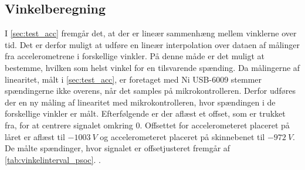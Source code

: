 \subsection{Vinkelberegning}\label{sec:imp_vinkler}
I \autoref{sec:test_acc} fremgår det, at der er lineær sammenhæng mellem vinklerne over tid. Det er derfor muligt at udføre en lineær interpolation over dataen af målinger fra accelerometrene i forskellige vinkler. På denne måde er det muligt at bestemme, hvilken som helst vinkel for en tilsvarende spænding. Da målingerne af linearitet, målt i \autoref{sec:test_acc}, er foretaget med Ni USB-6009 stemmer spændingerne ikke overens, når det samples på mikrokontrolleren. Derfor udføres der en ny måling af linearitet med mikrokontrolleren, hvor spændingen i de forskellige vinkler er målt. Efterfølgende er der aflæst et offset, som er trukket fra, for at centrere signalet omkring 0. Offsettet for accelerometeret placeret på låret er aflæst til $-1003~V$ og accelerometeret placeret på skinnebenet til $-972~V$. De målte spændinger, hvor signalet er offsetjusteret fremgår af \autoref{tab:vinkelinterval_psoc}. .



